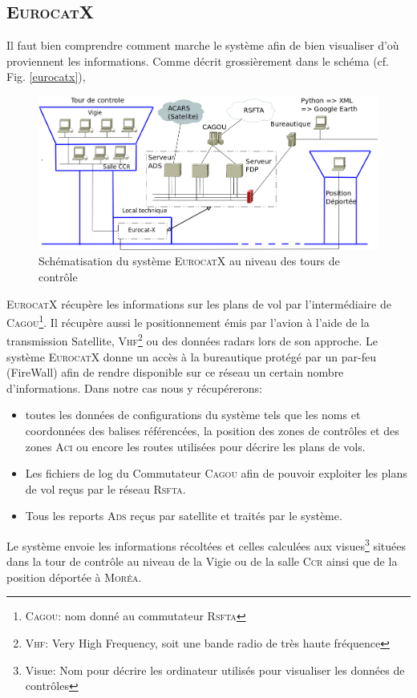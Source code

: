     \subsection{\textsc{EurocatX}}
Il faut bien comprendre comment marche le système afin de bien visualiser d'où proviennent les informations. Comme décrit grossièrement dans le schéma (cf. Fig. \vref{eurocatx}),
\begin{figure}[!h]
    \center
    \includegraphics[width=15cm]{images/SchemaControle.png}
    \caption{Schématisation du système \textsc{EurocatX} au niveau des tours de contrôle}
    \label{eurocatx}
\end{figure}
\textsc{EurocatX} récupère les informations sur les plans de vol par l'intermédiaire de \textsc{Cagou}\footnote{\textsc{Cagou}: nom donné au commutateur \textsc{Rsfta}}. Il récupère aussi le positionnement émis par l'avion à l'aide de la transmission Satellite, \textsc{Vhf}\footnote{\textsc{Vhf}: Very High Frequency, soit une bande radio de très haute fréquence} ou des données radars lors de son approche. Le système \textsc{EurocatX} donne un accès à la bureautique protégé par un par-feu (FireWall) afin de rendre disponible sur ce réseau un certain nombre d'informations. Dans notre cas nous y récupérerons:
\begin{itemize}
    \item toutes les données de configurations du système tels que les noms et coordonnées des balises référencées, la position des zones de contrôles et des zones \textsc{Aci} ou encore les routes utilisées pour décrire les plans de vols.
    \item Les fichiers de log du Commutateur \textsc{Cagou} afin de pouvoir exploiter les plans de vol reçus par le réseau \textsc{Rsfta}.
    \item Tous les reports \textsc{Ads} reçus par satellite et traités par le système.
\end{itemize}\medskip 
Le système envoie les informations récoltées et celles calculées aux visues\footnote{Visue: Nom pour décrire les ordinateur utilisés pour visualiser les données de contrôles} situées dans la tour de contrôle au niveau de la Vigie ou de la salle \textsc{Ccr} ainsi que de la position déportée à \textsc{Moréa}.

